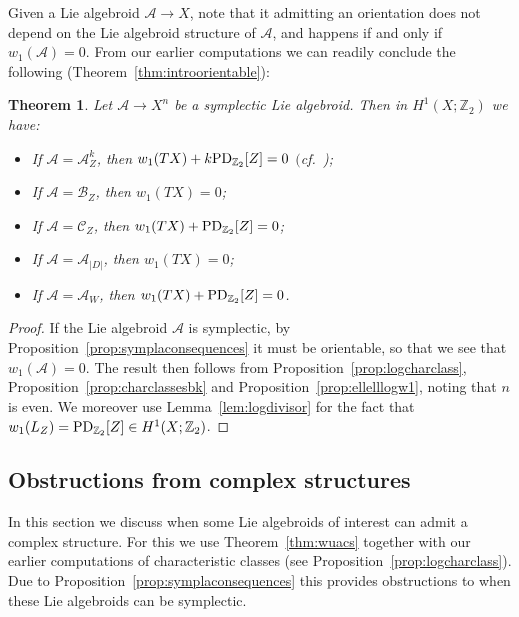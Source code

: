 \documentclass[pdftex]{sigma}
\numberwithin{equation}{section}
\newtheorem{Theorem}{Theorem}[section]
\begin{document}
Given a Lie algebroid $\mathcal{A} \to X$, note that it admitting an orientation does not depend on the Lie algebroid structure of $\mathcal{A}$, and happens if and only if $w_1(\mathcal{A}) = 0$. From our earlier computations we can readily conclude the following (Theorem~\ref{thm:introorientable}):

\begin{Theorem}\label{thm:orientable} Let $\mathcal{A} \to X^n$ be a symplectic Lie algebroid. Then in $H^1(X;\mathbb{Z}_2)$ we have:
	\begin{itemize}\itemsep=0pt
	\item If $\mathcal{A} = \mathcal{A}_Z^k$, then $w_1(TX) + k {\rm PD}_{\mathbb{Z}_2}[Z] = 0$ $($cf.\ {\rm \cite{MirandaPlanas18two,MirandaPlanas18})};
	\item If $\mathcal{A} = \mathcal{B}_Z$, then $w_1(TX) = 0$;
	\item If $\mathcal{A} = \mathcal{C}_Z$, then $w_1(TX) + {\rm PD}_{\mathbb{Z}_2}[Z] = 0$;
	\item If $\mathcal{A} = \mathcal{A}_{|D|}$, then $w_1(TX) = 0$;
	\item If $\mathcal{A} = \mathcal{A}_W$, then $w_1(TX) + {\rm PD}_{\mathbb{Z}_2}[Z] = 0$.
	\end{itemize}
\end{Theorem}

\begin{proof} If the Lie algebroid $\mathcal{A}$ is symplectic, by Proposition~\ref{prop:symplaconsequences} it must be orientable, so that we see that $w_1(\mathcal{A}) = 0$. The result then follows from Proposition~\ref{prop:logcharclass}, Proposition~\ref{prop:charclassesbk} and Proposition~\ref{prop:ellelllogw1}, noting that $n$ is even. We moreover use Lemma~\ref{lem:logdivisor} for the fact that $w_1(L_Z) = {\rm PD}_{\mathbb{Z}_2}[Z] \in H^1(X;\mathbb{Z}_2)$.
\end{proof}

\subsection{Obstructions from complex structures}\label{sec:existenceaacs}

In this section we discuss when some Lie algebroids of interest can admit a complex structure. For this we use Theorem~\ref{thm:wuacs} together with our earlier computations of characteristic classes (see Proposition~\ref{prop:logcharclass}). Due to Proposition~\ref{prop:symplaconsequences} this provides obstructions to when these Lie algebroids can be symplectic.
\end{document}
